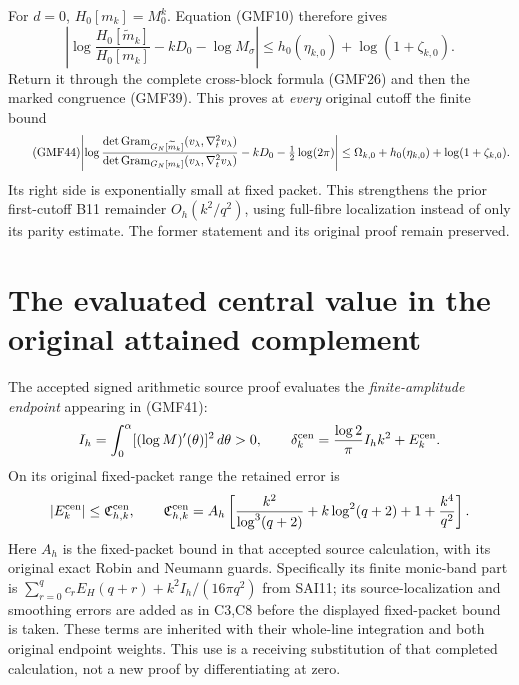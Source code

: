 \documentclass[11pt,a4paper]{article}
\begin{document}
For \(d=0\), \(H_0[m_k]=M_0^k\).
Equation (GMF10) therefore gives
\[
 \left|\log\frac{H_0[\widetilde m_k]}{H_0[m_k]}
            -kD_0-\log M_\sigma\right|
 \le h_0(\eta_{k,0})+\log(1+\zeta_{k,0}).
\]
Return it through the complete cross-block formula
(GMF26) and then the marked congruence (GMF39).
This proves at \emph{every} original cutoff the finite bound
\begin{equation}\tag{GMF44}
\begin{split}
 \left|
 \log\frac{\det\operatorname{Gram}_{G_N[\widetilde m_k]}(v_\lambda,\nabla_t^2v_\lambda)}
              {\det\operatorname{Gram}_{G_N[m_k]}(v_\lambda,\nabla_t^2v_\lambda)}
       -kD_0-\tfrac12\log(2\pi)
 \right|
 \le\Omega_{k,0}+h_0(\eta_{k,0})+\log(1+\zeta_{k,0}).
\end{split}
\end{equation}
Its right side is exponentially small at fixed packet.
This strengthens the prior first-cutoff B11 remainder
\(O_h(k^2/q^2)\), using full-fibre localization instead
of only its parity estimate.  The former statement and
its original proof remain preserved.

\section{The evaluated central value in the original attained complement}

The accepted signed arithmetic source proof
\cite[C32 and SAI1--SAI11]{a02gmf:signedCentral} evaluates the
\emph{finite-amplitude endpoint} appearing in (GMF41):
\[
 I_h=\int_0^\alpha[(\log M)'(\theta)]^2\,d\theta>0,\qquad
 \delta_k^{\rm cen}
  =\frac{\log2}{\pi}I_h k^2+E_k^{\rm cen}.
\]
On its original fixed-packet range the retained error is
\[
 |E_k^{\rm cen}|
 \le \mathfrak C_{h,k}^{\rm cen},\qquad
 \mathfrak C_{h,k}^{\rm cen}
 =A_h\left[
 \frac{k^2}{\log^3(q+2)}+k\log^2(q+2)+1+\frac{k^4}{q^2}
 \right].
\]
Here \(A_h\) is the fixed-packet bound in that accepted
source calculation, with its original exact Robin and
Neumann guards.  Specifically its finite monic-band part
is \(\sum_{r=0}^q c_rE_H(q+r)+k^2I_h/(16\pi q^2)\)
from SAI11; its source-localization and smoothing errors
are added as in C3,C8 before the displayed fixed-packet
bound is taken.  These terms are inherited with their
whole-line integration and both original endpoint weights.
This use is a receiving substitution of that completed
calculation, not a new proof by differentiating at zero.
\end{document}
